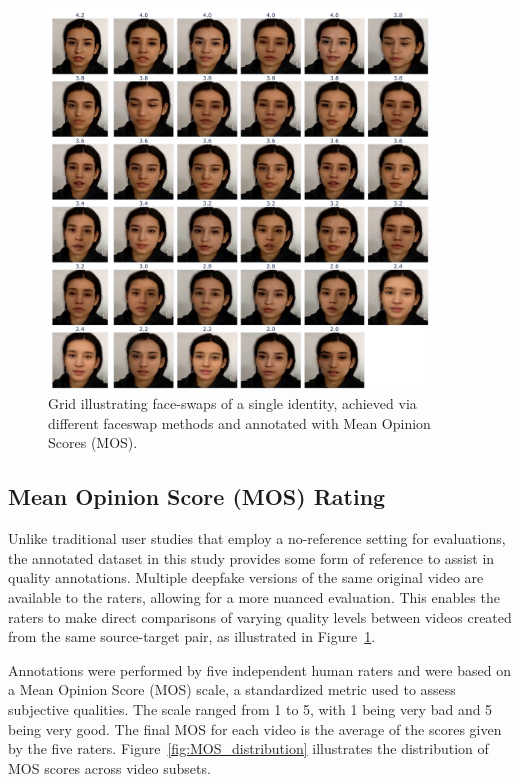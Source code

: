 \documentclass[a4paper,12pt,openright]{book}
\begin{document}
\begin{figure}[!htb]
    \centering
    \includegraphics[width=0.9\textwidth]{images/newplot.png}
    \caption{Grid illustrating face-swaps of a single identity, achieved via different faceswap methods and annotated with Mean Opinion Scores (MOS).}
    \label{fig:face-swap-example}
\end{figure}



\subsection{Mean Opinion Score (MOS) Rating}

Unlike traditional user studies that employ a no-reference setting for evaluations, the annotated dataset in this study provides some form of reference to assist in quality annotations. Multiple deepfake versions of the same original video are available to the raters, allowing for a more nuanced evaluation. This enables the raters to make direct comparisons of varying quality levels between videos created from the same source-target pair, as illustrated in Figure~\ref{fig:face-swap-example}. 

Annotations were performed by five independent human raters and were based on a Mean Opinion Score (MOS) scale, a standardized metric used to assess subjective qualities. The scale ranged from 1 to 5, with 1 being very bad and 5 being very good. The final MOS for each video is the average of the scores given by the five raters. Figure~\ref{fig:MOS_distribution} illustrates the distribution of MOS scores across video subsets.
\end{document}
